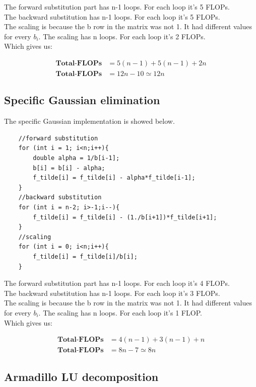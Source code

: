 \documentclass[12pt,norsk,a4paper]{article}
\begin{document}
The forward substitution part has n-1 loops. For each loop it's 5 FLOPs. \\
The backward substitution has n-1 loops. For each loop it's 5 FLOPs. \\
The scaling is because the b row in the matrix was not 1. It had different values for every $b_i$. The scaling has n loops. For each loop it's 2 FLOPs. \\
Which gives us: 

\begin{align*}
\textbf{Total-FLOPs} &= 5(n-1) + 5(n-1) + 2n
\\ 
\textbf{Total-FLOPs} &= 12n - 10 \simeq 12n
\end{align*}


\subsection{Specific Gaussian elimination}

The specific Gaussian implementation is showed below. 
\begin{lstlisting}
    //forward substitution
    for (int i = 1; i<n;i++){
        double alpha = 1/b[i-1];
        b[i] = b[i] - alpha;
        f_tilde[i] = f_tilde[i] - alpha*f_tilde[i-1];
    }
    //backward substitution
    for (int i = n-2; i>-1;i--){
        f_tilde[i] = f_tilde[i] - (1./b[i+1])*f_tilde[i+1];
    }
    //scaling
    for (int i = 0; i<n;i++){
        f_tilde[i] = f_tilde[i]/b[i];
    }
\end{lstlisting}

The forward substitution part has n-1 loops. For each loop it's 4 FLOPs. \\
The backward substitution has n-1 loops. For each loop it's 3 FLOPs. \\
The scaling is because the b row in the matrix was not 1. It had different values for every $b_i$. The scaling has n loops. For each loop it's 1 FLOP. \\
Which gives us: 

\begin{align*}
\textbf{Total-FLOPs} &= 4(n-1) + 3(n-1) + n
\\ 
\textbf{Total-FLOPs} &= 8n - 7 \simeq 8n
\end{align*}


\subsection{Armadillo LU decomposition}
\end{document}
